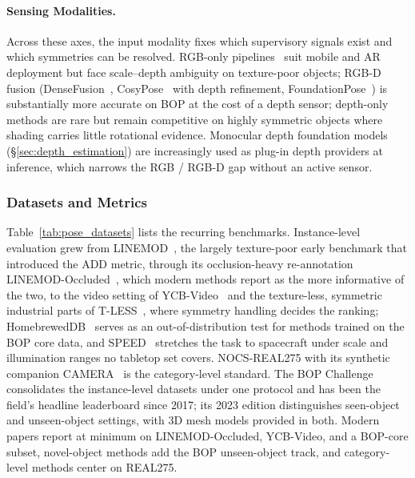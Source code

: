 \paragraph{Sensing Modalities.}
Across these axes, the input modality fixes which supervisory signals exist and which symmetries can be resolved. RGB-only pipelines~\cite{xiang2017posecnn,peng2019pvnet,wang2021gdrnet,chen2022epro,sun2022onepose} suit mobile and AR deployment but face scale--depth ambiguity on texture-poor objects; RGB-D fusion (DenseFusion~\cite{Wang2019DenseFusion}, CosyPose~\cite{Labbe2020CosyPose} with depth refinement, FoundationPose~\cite{wen2024foundationpose}) is substantially more accurate on BOP at the cost of a depth sensor; depth-only methods are rare but remain competitive on highly symmetric objects where shading carries little rotational evidence. Monocular depth foundation models (\S\ref{sec:depth_estimation}) are increasingly used as plug-in depth providers at inference, which narrows the RGB / RGB-D gap without an active sensor.

\subsubsection{Datasets and Metrics}
\label{sec:pose_datasets}

Table~\ref{tab:pose_datasets} lists the recurring benchmarks. Instance-level evaluation grew from LINEMOD~\cite{hinterstoisser2012linemod}, the largely texture-poor early benchmark that introduced the ADD metric, through its occlusion-heavy re-annotation LINEMOD-Occluded~\cite{brachmann2014lmo}, which modern methods report as the more informative of the two, to the video setting of YCB-Video~\cite{xiang2017posecnn} and the texture-less, symmetric industrial parts of T-LESS~\cite{Hodan2017TLESS}, where symmetry handling decides the ranking; HomebrewedDB~\cite{kaskman2019hbdb} serves as an out-of-distribution test for methods trained on the BOP core data, and SPEED~\cite{Sharma2019SpacecraftPE} stretches the task to spacecraft under scale and illumination ranges no tabletop set covers. NOCS-REAL275 with its synthetic companion CAMERA~\cite{Wang0HVSG19} is the category-level standard. The BOP Challenge~\cite{hodan2018bop,hodan2020bop,sundermeyer2023bop} consolidates the instance-level datasets under one protocol and has been the field's headline leaderboard since 2017; its 2023 edition distinguishes seen-object and unseen-object settings, with 3D mesh models provided in both. Modern papers report at minimum on LINEMOD-Occluded, YCB-Video, and a BOP-core subset, novel-object methods add the BOP unseen-object track, and category-level methods center on REAL275.

